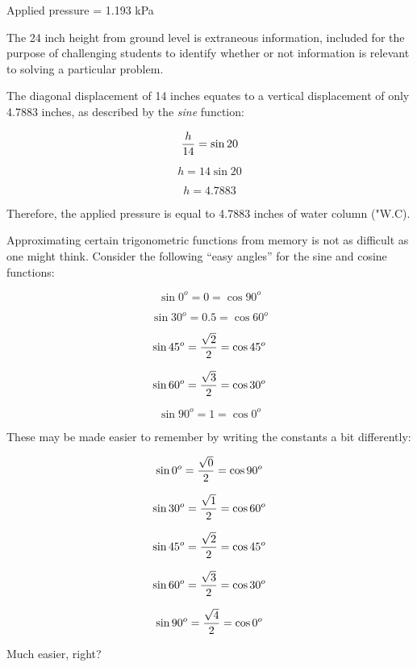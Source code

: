 





Applied pressure = 1.193 kPa







The 24 inch height from ground level is extraneous information, included for the purpose of challenging students to identify whether or not information is relevant to solving a particular problem.

\vskip 10pt

The diagonal displacement of 14 inches equates to a vertical displacement of only 4.7883 inches, as described by the {\it sine} function:

$${h \over 14} = \sin 20$$

$$h = 14 \sin 20$$

$$h = 4.7883$$

Therefore, the applied pressure is equal to 4.7883 inches of water column ("W.C).

\vskip 10pt

Approximating certain trigonometric functions from memory is not as difficult as one might think.  Consider the following ``easy angles'' for the sine and cosine functions:

$$\sin 0^o = 0 = \cos 90^o$$

$$\sin 30^o = 0.5 = \cos 60^o$$

$$\sin 45^o = {\sqrt{2} \over 2} = \cos 45^o$$

$$\sin 60^o = {\sqrt{3} \over 2} = \cos 30^o$$

$$\sin 90^o = 1 = \cos 0^o$$

These may be made easier to remember by writing the constants a bit differently:

$$\sin 0^o = {\sqrt{0} \over 2} = \cos 90^o$$

$$\sin 30^o = {\sqrt{1} \over 2} = \cos 60^o$$

$$\sin 45^o = {\sqrt{2} \over 2} = \cos 45^o$$

$$\sin 60^o = {\sqrt{3} \over 2} = \cos 30^o$$

$$\sin 90^o = {\sqrt{4} \over 2} = \cos 0^o$$

Much easier, right?





